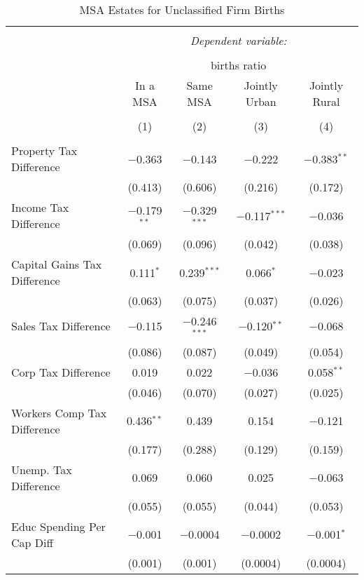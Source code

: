 
\begin{table}[!htbp] \centering 
  \caption{MSA Estates for  Unclassified Firm Births} 
  \label{99metro} 
\begin{tabular}{@{\extracolsep{5pt}}lcccc} 
\\[-1.8ex]\hline 
\hline \\[-1.8ex] 
 & \multicolumn{4}{c}{\textit{Dependent variable:}} \\ 
\cline{2-5} 
\\[-1.8ex] & \multicolumn{4}{c}{births ratio} \\ 
 & In a MSA & Same MSA & Jointly Urban & Jointly Rural \\ 
\\[-1.8ex] & (1) & (2) & (3) & (4)\\ 
\hline \\[-1.8ex] 
 Property Tax Difference & $-$0.363 & $-$0.143 & $-$0.222 & $-$0.383$^{**}$ \\ 
  & (0.413) & (0.606) & (0.216) & (0.172) \\ 
  Income Tax Difference & $-$0.179$^{**}$ & $-$0.329$^{***}$ & $-$0.117$^{***}$ & $-$0.036 \\ 
  & (0.069) & (0.096) & (0.042) & (0.038) \\ 
  Capital Gains Tax Difference & 0.111$^{*}$ & 0.239$^{***}$ & 0.066$^{*}$ & $-$0.023 \\ 
  & (0.063) & (0.075) & (0.037) & (0.026) \\ 
  Sales Tax Difference & $-$0.115 & $-$0.246$^{***}$ & $-$0.120$^{**}$ & $-$0.068 \\ 
  & (0.086) & (0.087) & (0.049) & (0.054) \\ 
  Corp Tax Difference & 0.019 & 0.022 & $-$0.036 & 0.058$^{**}$ \\ 
  & (0.046) & (0.070) & (0.027) & (0.025) \\ 
  Workers Comp Tax Difference & 0.436$^{**}$ & 0.439 & 0.154 & $-$0.121 \\ 
  & (0.177) & (0.288) & (0.129) & (0.159) \\ 
  Unemp. Tax Difference & 0.069 & 0.060 & 0.025 & $-$0.063 \\ 
  & (0.055) & (0.055) & (0.044) & (0.053) \\ 
  Educ Spending Per Cap Diff & $-$0.001 & $-$0.0004 & $-$0.0002 & $-$0.001$^{*}$ \\ 
  & (0.001) & (0.001) & (0.0004) & (0.0004) \\ 

\end{tabular}
\end{table}
